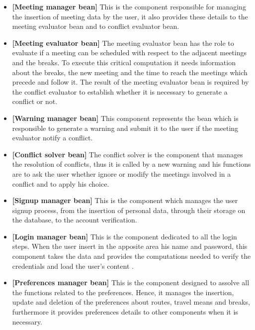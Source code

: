 \begin{itemize}
	\item \textbf{[\hypertarget{Meeting manager bean}{Meeting manager bean}]}  This is the component responsible for managing the insertion of meeting data by the user, it also provides these details to the meeting evaluator bean and to conflict evaluator bean.
	
	\item \textbf{[\hypertarget{Meeting evaluator bean}{Meeting evaluator bean}]} The meeting evaluator bean has the role to evaluate if a meeting can be scheduled with respect to the adjacent meetings and the breaks. To execute this critical computation it needs information about the breaks, the new meeting and the time to reach the meetings which precede and follow it. The result of the meeting evaluator bean is required by the conflict evaluator to establish whether it is necessary to generate a conflict or not.  \label{G3}
	
	\item \textbf{[\hypertarget{Warning manager bean}{Warning manager bean}]} This component represents the bean which is responsible to generate a warning and submit it to the user if the meeting evaluator notify a conflict.  \label{G4}
	
	\item \textbf{[\hypertarget{Conflict solver bean}{Conflict solver bean}]} The conflict solver is the component that manages the resolution of conflicts, thus it is called by a new warning and his functions are to ask the user whether ignore or modify the meetings involved in a conflict and to apply his choice. \label{G5}
	
	\item \textbf{[\hypertarget{Signup manager bean}{Signup manager bean}]} This is the component which manages the user signup process, from the insertion of personal data, through their storage on the database, to the account verification.  \label{G6}
	
	\item \textbf{[\hypertarget{Login manager bean}{Login manager bean}]} This is the component dedicated to all the login steps. When the user insert in the apposite area his name and password, this component takes the data and provides the computations needed to verify the credentials and load the user's content . \label{G7}
	
	\item \textbf{[\hypertarget{Preferences manager bean}{Preferences manager bean}]} This is the component designed to assolve all the functions related to the preferences. Hence, it manages the insertion, update and deletion of the preferences about routes, travel means and breaks, furthermore it provides preferences details to other components when it is necessary. \label{G8}
		

\end{itemize}
